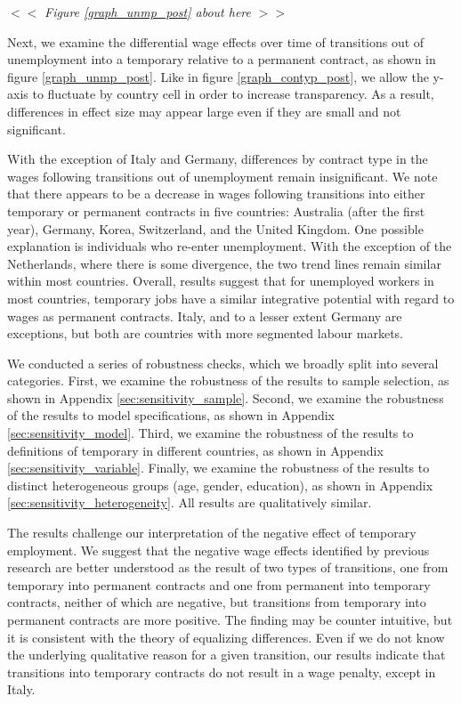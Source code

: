 \documentclass[12pt]{article}
\begin{document}
\begin{center}
$<<$ \emph{Figure \ref{graph_unmp_post} about here} $>>$
\end{center}

Next, we examine the differential wage effects over time of transitions out of unemployment into a temporary relative to a permanent contract, as shown in figure \ref{graph_unmp_post}.  Like in figure \ref{graph_contyp_post}, we allow the y-axis to fluctuate by country cell in order to increase transparency.  As a result, differences in effect size may appear large even if they are small and not significant.

With the exception of Italy and Germany, differences by contract type in the wages following transitions out of unemployment remain insignificant.  We note that there appears to be a decrease in wages following transitions into either temporary or permanent contracts in five countries:  Australia (after the first year), Germany, Korea, Switzerland, and the United Kingdom.  One possible explanation is individuals who re-enter unemployment.  With the exception of the Netherlands, where there is some divergence, the two trend lines remain similar within most countries.  Overall, results suggest that for unemployed workers in most countries, temporary jobs have a similar integrative potential with regard to wages as permanent contracts.  Italy, and to a lesser extent Germany are exceptions, but both are countries with more segmented labour markets. 

We conducted a series of robustness checks, which we broadly split into several categories.  First, we examine the robustness of the results to sample selection, as shown in Appendix \ref{sec:sensitivity_sample}.  Second, we examine the robustness of the results to model specifications, as shown in Appendix \ref{sec:sensitivity_model}.  Third, we examine the robustness of the results to definitions of temporary in different countries, as shown in Appendix \ref{sec:sensitivity_variable}.  Finally, we examine the robustness of the results to distinct heterogeneous groups (age, gender, education), as shown in Appendix \ref{sec:sensitivity_heterogeneity}.  All results are qualitatively similar.

The results challenge our interpretation of the negative effect of temporary employment.  We suggest that the negative wage effects identified by previous research are better understood as the result of two types of transitions, one from temporary into permanent contracts and one from permanent into temporary contracts, neither of which are negative, but transitions from temporary into permanent contracts are more positive.  The finding may be counter intuitive, but it is consistent with the theory of equalizing differences.  Even if we do not know the underlying qualitative reason for a given transition, our results indicate that transitions into temporary contracts do not result in a wage penalty, except in Italy.
\end{document}
